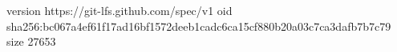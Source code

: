version https://git-lfs.github.com/spec/v1
oid sha256:bc067a4ef61f17ad16bf1572deeb1cadc6ca15cf880b20a03c7ca3dafb7b7c79
size 27653

